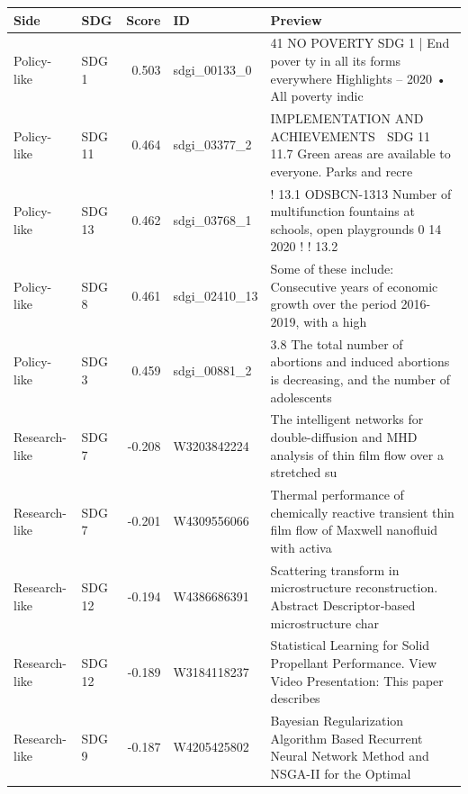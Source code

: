 \begin{tabular}{llrp{}p{}}
\toprule
Side & SDG & Score & ID & Preview \\
\midrule
Policy-like & SDG 1 & 0.503 & sdgi\_00133\_0 & 41 NO POVERTY SDG 1 | End pover ty in all its forms everywhere Highlights – 2020 • All poverty indic \\
Policy-like & SDG 11 & 0.464 & sdgi\_03377\_2 & IMPLEMENTATION AND ACHIEVEMENTS  SDG 11 11.7 Green areas are available to everyone. Parks and recre \\
Policy-like & SDG 13 & 0.462 & sdgi\_03768\_1 & ! 13.1 ODSBCN-1313 Number of multifunction fountains at schools, open playgrounds 0 14 2020 ! ! 13.2 \\
Policy-like & SDG 8 & 0.461 & sdgi\_02410\_13 & Some of these include:  Consecutive years of economic growth over the period 2016-2019, with a high \\
Policy-like & SDG 3 & 0.459 & sdgi\_00881\_2 & 3.8 The total number of abortions and induced abortions is decreasing, and the number of adolescents \\
\midrule
Research-like & SDG 7 & -0.208 & W3203842224 & The intelligent networks for double-diffusion and MHD analysis of thin film flow over a stretched su \\
Research-like & SDG 7 & -0.201 & W4309556066 & Thermal performance of chemically reactive transient thin film flow of Maxwell nanofluid with activa \\
Research-like & SDG 12 & -0.194 & W4386686391 & Scattering transform in microstructure reconstruction. Abstract Descriptor‐based microstructure char \\
Research-like & SDG 12 & -0.189 & W3184118237 & Statistical Learning for Solid Propellant Performance. View Video Presentation: This paper describes \\
Research-like & SDG 9 & -0.187 & W4205425802 & Bayesian Regularization Algorithm Based Recurrent Neural Network Method and NSGA-II for the Optimal  \\
\bottomrule
\end{tabular}
